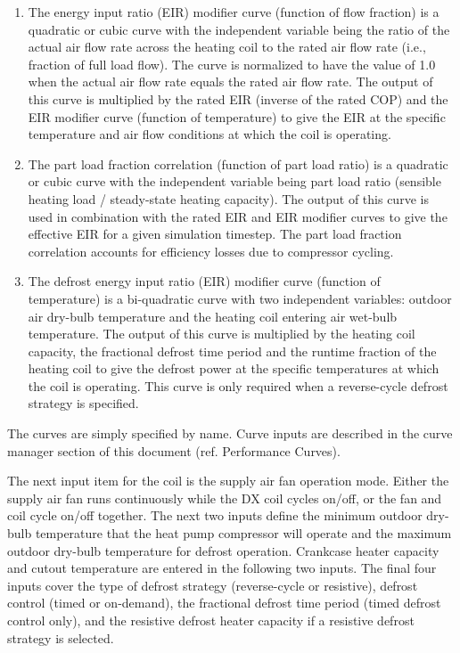 \begin{enumerate}
\item
  The energy input ratio (EIR) modifier curve (function of flow fraction) is a quadratic or cubic curve with the independent variable being the ratio of the actual air flow rate across the heating coil to the rated air flow rate (i.e., fraction of full load flow). The curve is normalized to have the value of 1.0 when the actual air flow rate equals the rated air flow rate. The output of this curve is multiplied by the rated EIR (inverse of the rated COP) and the EIR modifier curve (function of temperature) to give the EIR at the specific temperature and air flow conditions at which the coil is operating.
\item
  The part load fraction correlation (function of part load ratio) is a quadratic or cubic curve with the independent variable being part load ratio (sensible heating load / steady-state heating capacity). The output of this curve is used in combination with the rated EIR and EIR modifier curves to give the effective EIR for a given simulation timestep. The part load fraction correlation accounts for efficiency losses due to compressor cycling.
\item
  The defrost energy input ratio (EIR) modifier curve (function of temperature) is a bi-quadratic curve with two independent variables: outdoor air dry-bulb temperature and the heating coil entering air wet-bulb temperature. The output of this curve is multiplied by the heating coil capacity, the fractional defrost time period and the runtime fraction of the heating coil to give the defrost power at the specific temperatures at which the coil is operating. This curve is only required when a reverse-cycle defrost strategy is specified.
\end{enumerate}

The curves are simply specified by name. Curve inputs are described in the curve manager section of this document (ref. Performance Curves).

The next input item for the coil is the supply air fan operation mode. Either the supply air fan runs continuously while the DX coil cycles on/off, or the fan and coil cycle on/off together. The next two inputs define the minimum outdoor dry-bulb temperature that the heat pump compressor will operate and the maximum outdoor dry-bulb temperature for defrost operation. Crankcase heater capacity and cutout temperature are entered in the following two inputs. The final four inputs cover the type of defrost strategy (reverse-cycle or resistive), defrost control (timed or on-demand), the fractional defrost time period (timed defrost control only), and the resistive defrost heater capacity if a resistive defrost strategy is selected.

